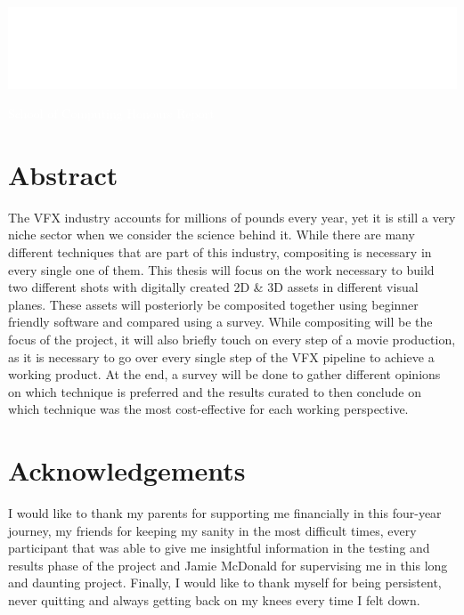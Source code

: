 \documentclass[11pt, twoside]{report}
\begin{document}
\pagecolor{violet}\afterpage{\nopagecolor}


\vspace*{\fill}
\begingroup
\centering

\includegraphics[width=14cm]{rgulogo-white.png}



\textcolor{white}{School of Computing
Honours Report
}


\endgroup
\vspace*{\fill}

\chapter*{Abstract}
The VFX industry accounts for millions of pounds every year, yet it is still a very niche sector when we consider the science behind it. While there are many different techniques that are part of this industry, compositing is necessary in every single one of them. This thesis will focus on the work necessary to build two different shots with digitally created 2D \& 3D assets in different visual planes. These assets will posteriorly be composited together using beginner friendly software and compared using a survey. While compositing will be the focus of the project, it will also briefly touch on every step of a movie production, as it is necessary to go over every single step of the VFX pipeline to achieve a working product. At the end, a survey will be done to gather different opinions on which technique is preferred and the results curated to then conclude on which technique was the most cost-effective for each working perspective.

\chapter*{Acknowledgements}
I would like to thank my parents for supporting me financially in this four-year journey, my friends for keeping my sanity in the most difficult times, every participant that was able to give me insightful information in the testing and results phase of the project and Jamie McDonald for supervising me in this long and daunting project. Finally, I would like to thank myself for being persistent, never quitting and always getting back on my knees every time I felt down.
\end{document}
